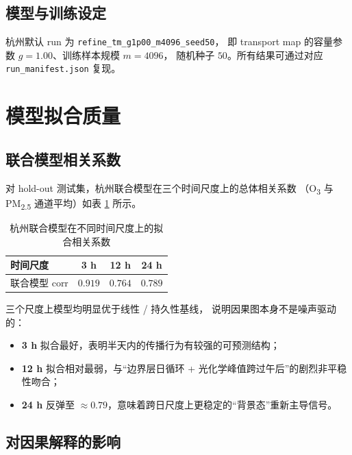 \documentclass[11pt,a4paper]{article}
\begin{document}
\subsection{模型与训练设定}

杭州默认 run 为 \texttt{refine\_tm\_g1p00\_m4096\_seed50}，
即 transport map 的容量参数 $g{=}1.00$、训练样本规模 $m{=}4096$，
随机种子 $50$。所有结果可通过对应 \texttt{run\_manifest.json} 复现。

\section{模型拟合质量}

\subsection{联合模型相关系数}

对 hold-out 测试集，杭州联合模型在三个时间尺度上的总体相关系数
（O\textsubscript{3} 与 PM\textsubscript{2.5} 通道平均）如表
\ref{tab:hz_corr} 所示。

\begin{table}[htbp]
\centering
\caption{杭州联合模型在不同时间尺度上的拟合相关系数}
\label{tab:hz_corr}
\begin{tabular}{lccc}
\toprule
时间尺度 & 3 h & 12 h & 24 h \\
\midrule
联合模型 corr & $0.919$ & $0.764$ & $0.789$ \\
\bottomrule
\end{tabular}
\end{table}

三个尺度上模型均明显优于线性 / 持久性基线，
说明因果图本身不是噪声驱动的：
\begin{itemize}[leftmargin=2em]
  \item \textbf{3 h} 拟合最好，表明半天内的传播行为有较强的可预测结构；
  \item \textbf{12 h} 拟合相对最弱，与“边界层日循环 + 光化学峰值跨过午后”的剧烈非平稳性吻合；
  \item \textbf{24 h} 反弹至 $\approx 0.79$，意味着跨日尺度上更稳定的“背景态”重新主导信号。
\end{itemize}

\subsection{对因果解释的影响}
\end{document}
